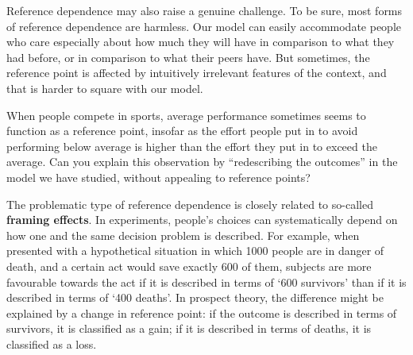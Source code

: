 
Reference dependence may also raise a genuine challenge. To be sure,
most forms of reference dependence are harmless. Our model can easily
accommodate people who care especially about how much they will have in
comparison to what they had before, or in comparison to what their
peers have. But sometimes, the reference point is affected by
intuitively irrelevant features of the context, and that is harder to
square with our model.

\begin{exercise}{1}
  When people compete in sports, average performance sometimes seems
  to function as a reference point, insofar as the effort people put in
  to avoid performing below average is higher than the effort they put
  in to exceed the average.%
  Can you explain this observation by ``redescribing the outcomes'' in
  the model we have studied, without appealing to reference points?
\end{exercise}


The problematic type of reference dependence is closely related to
so-called \textbf{framing effects}. In experiments, people's choices
can systematically depend on how one and the same decision problem is
described. For example, when presented with a hypothetical situation
in which 1000 people are in danger of death, and a certain act would
save exactly 600 of them, subjects are more favourable towards the act
if it is described in terms of `600 survivors' than if it is described
in terms of `400 deaths'. In prospect theory, the difference might be
explained by a change in reference point: if the outcome is described
in terms of survivors, it is classified as a gain; if it is described
in terms of deaths, it is classified as a loss.

